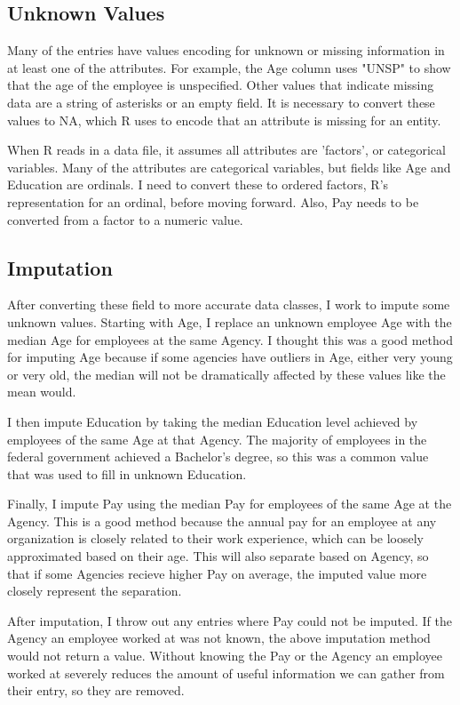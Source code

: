 \documentclass{article}
\begin{document}
    \subsection{Unknown Values}
    Many of the entries have values encoding for unknown or missing information in at least one of the attributes. For example, the Age column uses "UNSP" to show that the age of the employee is unspecified. Other values that indicate missing data are a string of asterisks or an empty field. It is necessary to convert these values to NA, which R uses to encode that an attribute is missing for an entity.
    \par
    When R reads in a data file, it assumes all attributes are 'factors', or categorical variables. Many of the attributes are categorical variables, but fields like Age and Education are ordinals. I need to convert these to ordered factors, R's representation for an ordinal, before moving forward. Also, Pay needs to be converted from a factor to a numeric value.

    \subsection{Imputation}
    After converting these field to more accurate data classes, I work to impute some unknown values. Starting with Age, I replace an unknown employee Age with the median Age for employees at the same Agency. I thought this was a good method for imputing Age because if some agencies have outliers in Age, either very young or very old, the median will not be dramatically affected by these values like the mean would.
    \par
    I then impute Education by taking the median Education level achieved by employees of the same Age at that Agency. The majority of employees in the federal government achieved a Bachelor's degree, so this was a common value that was used to fill in unknown Education.
    \par
    Finally, I impute Pay using the median Pay for employees of the same Age at the Agency. This is a good method because the annual pay for an employee at any organization is closely related to their work experience, which can be loosely approximated based on their age. This will also separate based on Agency, so that if some Agencies recieve higher Pay on average, the imputed value more closely represent the separation.
    \par
    After imputation, I throw out any entries where Pay could not be imputed. If the Agency an employee worked at was not known, the above imputation method would not return a value. Without knowing the Pay or the Agency an employee worked at severely reduces the amount of useful information we can gather from their entry, so they are removed.
\end{document}
